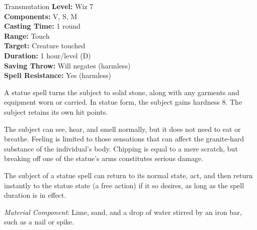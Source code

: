 {Transmutation}
{
	\textbf{Level:}
	Wiz 7\\
	\textbf{Components:}
	V, S, M\\
	\textbf{Casting Time:}
	1 round\\
	\textbf{Range:}
	Touch\\
	\textbf{Target:}
	Creature touched\\
	\textbf{Duration:}
	1 hour/level (D)\\
	\textbf{Saving Throw:}
	Will negates (harmless)\\
	\textbf{Spell Resistance:}
	Yes (harmless)\\
}
{
	A statue spell turns the subject to solid stone, along with any garments and equipment worn or carried. In statue form, the subject gains hardness 8. The subject retains its own hit points.

	The subject can see, hear, and smell normally, but it does not need to eat or breathe. Feeling is limited to those sensations that can affect the granite-hard substance of the individual's body. Chipping is equal to a mere scratch, but breaking off one of the statue's arms constitutes serious damage.

	The subject of a statue spell can return to its normal state, act, and then return instantly to the statue state (a free action) if it so desires, as long as the spell duration is in effect.

	\textit{Material Component}:
	Lime, sand, and a drop of water stirred by an iron bar, such as a nail or spike.

}
